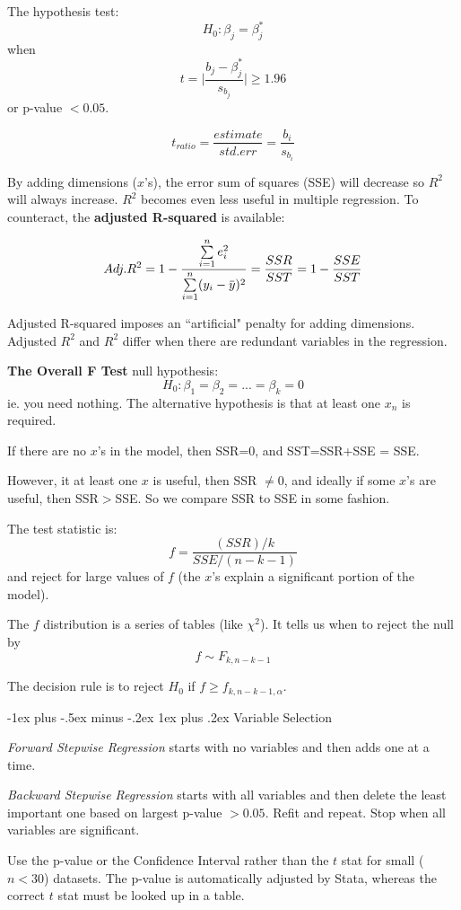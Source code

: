 \documentclass[10pt,landscape]{article}
\makeatletter
\renewcommand{\subsubsection}{\@startsection{subsubsection}{3}{0mm}%
                                {-1ex plus -.5ex minus -.2ex}%
                                {1ex plus .2ex}%
                                {\normalfont\small\bfseries}}
\newcommand{\overbar}[1]{\mkern 1.5mu\overline{\mkern-1.5mu#1\mkern-1.5mu}\mkern 1.5mu}
\makeatother
\begin{document}
\begin{multicols*}{3}
The hypothesis test:
\[
H_0 : \beta_j = \beta_j^*
\]
when 
\[
t = \Bigg\lvert \frac{b_j - \beta_j^*} { s_{b_j} } \Bigg\lvert \geq 1.96
\]
 or p-value $< 0.05$.
 
 \[
 t_{ratio} = \frac{estimate}{std. err} = \frac{b_i} {s_{b_i}}
 \]
 
By adding dimensions ($x$'s), the error sum of squares (SSE) will decrease so $R^2$ will always increase. $R^2$ becomes even less useful in multiple regression. To counteract, the \textbf{adjusted R-squared} is available:

\[
Adj. R^2 = 1 - \frac{ \sum\limits_{i=1}^n e^2_i} {\sum\limits_{i=1}^n (y_i - \overbar{y})^2} = \frac{SSR}{SST} =  1 - \frac{SSE}{SST}
\]

Adjusted R-squared imposes an ``artificial" penalty for adding dimensions. Adjusted $R^2$ and $R^2$ differ when there are redundant variables in the regression.

\textbf{The Overall F Test} null hypothesis:
\[
H_0 : \beta_1 = \beta_2 = ... = \beta_k = 0
\]
ie. you need nothing. The alternative hypothesis is that at least one $x_n$ is required.

If there are no $x$'s in the model, then SSR=0, and SST=SSR+SSE = SSE.

However, it at least one $x$ is useful, then SSR $\neq 0$, and ideally if some $x$'s are useful, then SSR$>$SSE. So we compare SSR to SSE in some fashion.

The test statistic is:
\[
f = \frac{ (SSR)/k} {SSE/(n-k-1)}
\]
and reject for large values of $f$ (the $x$'s explain a significant portion of the model).

The $f$ distribution is a series of tables (like $\chi^2$). It tells us when to reject the null by
\[
f \sim F_{k,n-k-1}
\]

The decision rule is to reject $H_0$ if $f \geq f_{k, n-k-1, \alpha}$.

\subsubsection{Variable Selection}

\textit{Forward Stepwise Regression} starts with no variables and then adds one at a time.

\textit{Backward Stepwise Regression} starts with all variables and then delete the least important one based on largest p-value $> 0.05$. Refit and repeat. Stop when all variables are significant.

Use the p-value or the Confidence Interval rather than the $t$ stat for small ($n < 30$) datasets. The p-value is automatically adjusted by Stata, whereas the correct $t$ stat must be looked up in a table.


\end{multicols*}
\end{document}
